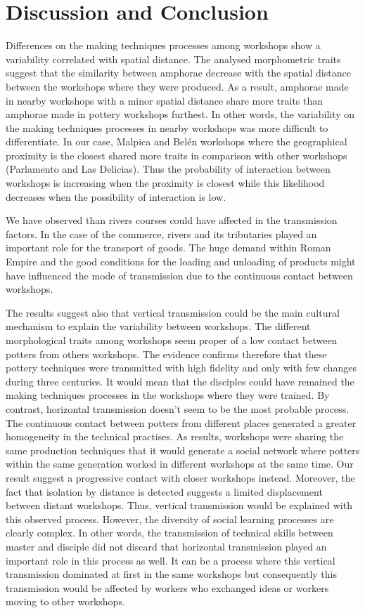 \documentclass[review]{elsarticle}
\begin{document}
\section{Discussion and Conclusion}

Differences on the making techniques processes among workshops show a variability correlated with spatial distance. The analysed morphometric traits suggest that the similarity between amphorae decrease with the spatial distance between the workshops where they were produced. As a result, amphorae made in nearby workshops with a minor spatial distance share more traits than amphorae made in pottery workshops furthest. In other words, the variability on the making techniques processes in nearby workshops was more difficult to differentiate. In our case, Malpica and Bel\'en workshops where the geographical proximity is the closest shared more traits in comparison with other workshops (Parlamento and Las Delicias). Thus the probability of interaction between workshops is increasing when the proximity is closest while this likelihood decreases when the possibility of interaction is low. 

We have observed than rivers courses could have affected in the transmission factors. In the case of the commerce, rivers and its tributaries played an important role for the transport of goods. The huge demand within Roman Empire and the good conditions for the loading and unloading of products \citep{bevan_mediterranean_2014} might have influenced the mode of transmission due to the continuous contact between workshops. 

The results suggest also that vertical transmission could be the main cultural mechanism to explain the variability between workshops. The different morphological traits among workshops seem proper of a low contact between potters from others workshops. The evidence confirms therefore that these pottery techniques were transmitted with high fidelity and only with few changes during three centuries. It would mean that the disciples could have remained the making techniques processes in the workshops where they were trained. By contrast, horizontal transmission doesn't seem to be the most probable process. The continuous contact between potters from different places generated a greater homogeneity in the technical practises. As results, workshops were sharing the same production techniques that it would generate a social network where potters within the same generation worked in different workshops at the same time. Our result suggest a progressive contact with closer workshops instead. Moreover, the fact that isolation by distance is detected suggests a limited displacement between distant workshops. Thus, vertical transmission would be explained with this observed process. However, the diversity of social learning processes are clearly complex. In other words, the transmission of technical skills between master and disciple did not discard that horizontal transmission played an important role in this process as well. It can be a process where this vertical transmission dominated at first in the same workshops but consequently this transmission would be affected by workers who exchanged ideas or workers moving to other workshops. 
\end{document}
